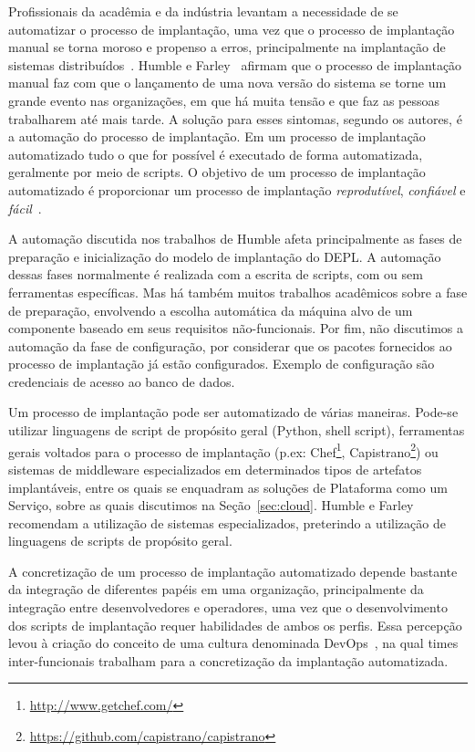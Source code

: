 Profissionais da acadêmia e da indústria levantam a necessidade de se automatizar o processo de implantação, uma vez que o processo de implantação manual se torna moroso e propenso a erros, principalmente na implantação de sistemas distribuídos~\cite{Humble2011Continuous,Dolstra2005Configuration}. 
Humble e Farley~\cite{Humble2011Continuous} afirmam que o processo de implantação manual faz com que  
o lançamento de uma nova versão do sistema se torne um grande evento nas organizações, 
em que há muita tensão e que faz as pessoas trabalharem até mais tarde.
A solução para esses sintomas, segundo os autores, é a automação do processo de implantação.
Em um processo de implantação automatizado tudo o que for possível é executado de forma automatizada,
geralmente por meio de scripts. O objetivo de um processo de implantação automatizado
é proporcionar um processo de implantação \emph{reprodutível}, \emph{confiável} e \emph{fácil}~\cite{Humble2011Continuous}.

A automação discutida nos trabalhos de Humble afeta principalmente as fases de preparação e inicialização do modelo de implantação do DEPL. A automação dessas fases normalmente é realizada com a escrita de scripts, com ou sem ferramentas específicas. Mas há também muitos trabalhos acadêmicos sobre a fase de preparação, envolvendo a escolha automática da máquina alvo de um componente baseado em seus requisitos não-funcionais. Por fim, não discutimos a automação da fase de configuração, por considerar que os pacotes fornecidos ao processo de implantação já estão configurados. Exemplo de configuração são credenciais de acesso ao banco de dados.

Um processo de implantação pode ser automatizado de várias maneiras.
Pode-se utilizar linguagens de script de propósito geral (Python, shell script),
ferramentas gerais voltados para o processo de implantação (p.ex: 
Chef\footnote{\url{http://www.getchef.com/}}, Capistrano\footnote{\url{https://github.com/capistrano/capistrano}})
ou sistemas de middleware especializados em determinados tipos de artefatos implantáveis,
entre os quais se enquadram as soluções de Plataforma como um Serviço,
sobre as quais discutimos na Seção~\ref{sec:cloud}.
Humble e Farley recomendam a utilização de sistemas especializados, preterindo 
a utilização de linguagens de scripts de propósito geral.

A concretização de um processo de implantação automatizado depende bastante da
integração de diferentes papéis em uma organização, principalmente da integração entre desenvolvedores
e operadores, uma vez que o desenvolvimento dos scripts de implantação requer
habilidades de ambos os perfis.
Essa percepção levou à criação do conceito de uma cultura 
denominada DevOps~\cite{Humble2011DevOps}, na qual times inter-funcionais
trabalham para a concretização da implantação automatizada.

